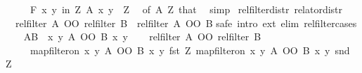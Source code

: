 \begin{isabellebody}
\ \ \ \ \ {\isachardoublequoteopen}{\isasymforall}\isactrlsub F\ {\isacharparenleft}{\kern0pt}x{\isacharcomma}{\kern0pt}\ y{\isacharparenright}{\kern0pt}\ in\ Z{\isachardot}{\kern0pt}\ A\ x\ y{\isachardoublequoteclose}\ \ Z\ \isamarkupfalse%
\ {\isacharasterisk}{\kern0pt}{\isacharbrackleft}{\kern0pt}of\ {\isachardoublequoteopen}A{\isasyminverse}{\isasyminverse}{\isachardoublequoteclose}\ Z{\isacharbrackright}{\kern0pt}\ that\ \isamarkupfalse%
\ simp\isanewline
{}\isamarkupfalse%
%
\endisatagproof
{\isafoldproof}%
%
\isadelimproof
\isanewline
%
\endisadelimproof
\isanewline
{}\isamarkupfalse%
\ rel{\isacharunderscore}{\kern0pt}filter{\isacharunderscore}{\kern0pt}distr\ {\isacharbrackleft}{\kern0pt}relator{\isacharunderscore}{\kern0pt}distr{\isacharbrackright}{\kern0pt}{\isacharcolon}{\kern0pt}\isanewline
\ \ {\isachardoublequoteopen}rel{\isacharunderscore}{\kern0pt}filter\ A\ OO\ rel{\isacharunderscore}{\kern0pt}filter\ B\ {\isacharequal}{\kern0pt}\ rel{\isacharunderscore}{\kern0pt}filter\ {\isacharparenleft}{\kern0pt}A\ OO\ B{\isacharparenright}{\kern0pt}{\isachardoublequoteclose}\isanewline
%
\isadelimproof
%
\endisadelimproof
%
\isatagproof
{}\isamarkupfalse%
{\isacharparenleft}{\kern0pt}safe\ intro{\isacharbang}{\kern0pt}{\isacharcolon}{\kern0pt}\ ext\ elim{\isacharbang}{\kern0pt}{\isacharcolon}{\kern0pt}\ rel{\isacharunderscore}{\kern0pt}filter{\isachardot}{\kern0pt}cases{\isacharparenright}{\kern0pt}\isanewline
\ \ \isamarkupfalse%
\ {\isacharquery}{\kern0pt}AB\ {\isacharequal}{\kern0pt}\ {\isachardoublequoteopen}{\isacharbraceleft}{\kern0pt}{\isacharparenleft}{\kern0pt}x{\isacharcomma}{\kern0pt}\ y{\isacharparenright}{\kern0pt}{\isachardot}{\kern0pt}\ {\isacharparenleft}{\kern0pt}A\ OO\ B{\isacharparenright}{\kern0pt}\ x\ y{\isacharbraceright}{\kern0pt}{\isachardoublequoteclose}\isanewline
\ \ \isamarkupfalse%
\ {\isachardoublequoteopen}{\isacharparenleft}{\kern0pt}rel{\isacharunderscore}{\kern0pt}filter\ A\ OO\ rel{\isacharunderscore}{\kern0pt}filter\ B{\isacharparenright}{\kern0pt}\isanewline
\ \ \ \ \ {\isacharparenleft}{\kern0pt}map{\isacharunderscore}{\kern0pt}filter{\isacharunderscore}{\kern0pt}on\ {\isacharbraceleft}{\kern0pt}{\isacharparenleft}{\kern0pt}x{\isacharcomma}{\kern0pt}\ y{\isacharparenright}{\kern0pt}{\isachardot}{\kern0pt}\ {\isacharparenleft}{\kern0pt}A\ OO\ B{\isacharparenright}{\kern0pt}\ x\ y{\isacharbraceright}{\kern0pt}\ fst\ Z{\isacharparenright}{\kern0pt}\ {\isacharparenleft}{\kern0pt}map{\isacharunderscore}{\kern0pt}filter{\isacharunderscore}{\kern0pt}on\ {\isacharbraceleft}{\kern0pt}{\isacharparenleft}{\kern0pt}x{\isacharcomma}{\kern0pt}\ y{\isacharparenright}{\kern0pt}{\isachardot}{\kern0pt}\ {\isacharparenleft}{\kern0pt}A\ OO\ B{\isacharparenright}{\kern0pt}\ x\ y{\isacharbraceright}{\kern0pt}\ snd\ Z{\isacharparenright}{\kern0pt}{\isachardoublequoteclose}\isanewline

\end{isabellebody}
